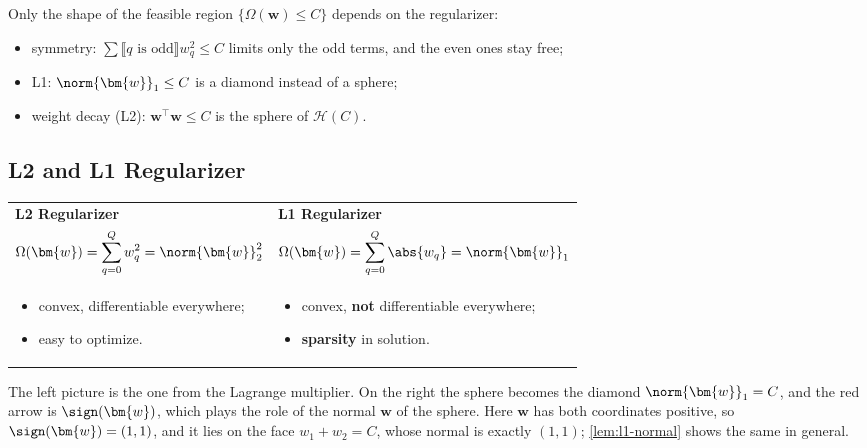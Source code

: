 \begin{remark}
    Only the shape of the feasible region \(\{\Omega(\bm{w}) \le C\}\)
    depends on the regularizer:
    \begin{itemize}
        \item symmetry: \(\sum \llbracket q \text{ is odd} \rrbracket w_q^2
            \le C\) limits only the odd terms, and the even ones stay free;
        \item L1: \(\norm{\bm{w}}_1 \le C\) is a diamond instead of a sphere;
        \item weight decay (L2): \(\bm{w}^\top \bm{w} \le C\) is the sphere of
            \(\mathcal{H}(C)\).
    \end{itemize}
\end{remark}

\subsection{L2 and L1 Regularizer}

\begin{center}
    \hspace{1cm}
\end{center}

\begin{center}
    \begin{tabular}{p{}p{}}
        \textbf{L2 Regularizer} & \textbf{L1 Regularizer}\\[2pt]
        \(\displaystyle \Omega(\bm{w}) = \sum_{q=0}^{Q} w_q^2 =
        \norm{\bm{w}}_2^2\)
        &
        \(\displaystyle \Omega(\bm{w}) = \sum_{q=0}^{Q} \abs{w_q} =
        \norm{\bm{w}}_1\)\\[10pt]
        \begin{itemize}
            \item convex, differentiable everywhere;
            \item easy to optimize.
        \end{itemize}
        &
        \begin{itemize}
            \item convex, \textbf{not} differentiable everywhere;
            \item \textbf{sparsity} in solution.
        \end{itemize}
    \end{tabular}
\end{center}

The left picture is the one from the Lagrange multiplier. On the right the
sphere becomes the diamond \(\norm{\bm{w}}_1 = C\), and the red arrow is
\(\sign(\bm{w})\), which plays the role of the normal \(\bm{w}\) of the
sphere. Here \(\bm{w}\) has both coordinates positive, so \(\sign(\bm{w}) =
(1, 1)\), and it lies on the face \(w_1 + w_2 = C\), whose normal is exactly
\((1, 1)\); \autoref{lem:l1-normal} shows the same in general.

